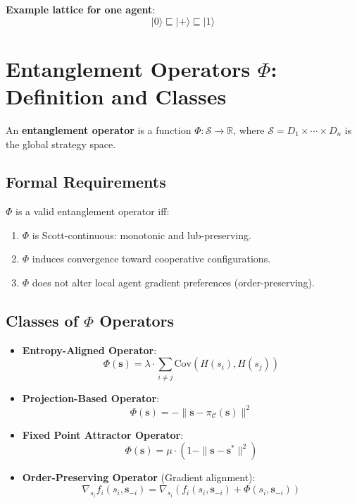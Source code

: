 \documentclass[11pt]{article}
\begin{document}
\textbf{Example lattice for one agent}:
\[
|0\rangle \sqsubseteq |+\rangle \sqsubseteq |1\rangle
\]

\section{Entanglement Operators \texorpdfstring{$\Phi$}{Φ}: Definition and Classes}

An \textbf{entanglement operator} is a function $\Phi: \mathcal{S} \to \mathbb{R}$, where $\mathcal{S} = D_1 \times \cdots \times D_n$ is the global strategy space.

\subsection*{Formal Requirements}
$\Phi$ is a valid entanglement operator iff:
\begin{enumerate}[label=(\alph*),noitemsep]
    \item $\Phi$ is Scott-continuous: monotonic and lub-preserving.
    \item $\Phi$ induces convergence toward cooperative configurations.
    \item $\Phi$ does not alter local agent gradient preferences (order-preserving).
\end{enumerate}

\subsection*{Classes of $\Phi$ Operators}

\begin{itemize}
    \item \textbf{Entropy-Aligned Operator}:
    \[
    \Phi(\mathbf{s}) = \lambda \cdot \sum_{i \neq j} \text{Cov}(H(s_i), H(s_j))
    \]

    \item \textbf{Projection-Based Operator}:
    \[
    \Phi(\mathbf{s}) = -\| \mathbf{s} - \pi_{\mathcal{C}}(\mathbf{s}) \|^2
    \]

    \item \textbf{Fixed Point Attractor Operator}:
    \[
    \Phi(\mathbf{s}) = \mu \cdot \left(1 - \| \mathbf{s} - \mathbf{s}^* \|^2 \right)
    \]

    \item \textbf{Order-Preserving Operator} (Gradient alignment):
    \[
    \nabla_{s_i} f_i(s_i, \mathbf{s}_{-i}) = \nabla_{s_i} \left(f_i(s_i, \mathbf{s}_{-i}) + \Phi(s_i, \mathbf{s}_{-i})\right)
    \]
\end{itemize}
\end{document}

